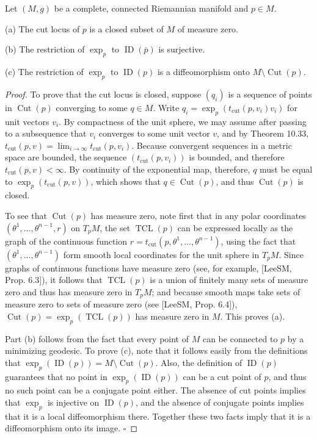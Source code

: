 \begin{theorem}
\label{thm:cut-locus-properties}
Let $(M,g)$ be a complete, connected Riemannian manifold and $p \in M$.

(a) The cut locus of $p$ is a closed subset of $M$ of measure zero.

(b) The restriction of $\exp_p$ to $\operatorname{ID}(\bar{p})$ is surjective.

(c) The restriction of $\exp_p$ to $\operatorname{ID}(p)$ is a diffeomorphism onto $M \setminus \operatorname{Cut}(p)$.

\begin{proof}
To prove that the cut locus is closed, suppose $(q_i)$ is a sequence of points in $\operatorname{Cut}(p)$ converging to some $q \in M$. Write $q_i = \exp_p(t_{\operatorname{cut}}(p, v_i)v_i)$ for unit vectors $v_i$. By compactness of the unit sphere, we may assume after passing to a subsequence that $v_i$ converges to some unit vector $v$, and by Theorem 10.33, $t_{\operatorname{cut}}(p, v) = \lim_{i \to \infty} t_{\operatorname{cut}}(p, v_i)$. Because convergent sequences in a metric space are bounded, the sequence $(t_{\operatorname{cut}}(p, v_i))$ is bounded, and therefore $t_{\operatorname{cut}}(p, v) < \infty$. By continuity of the exponential map, therefore, $q$ must be equal to $\exp_p(t_{\operatorname{cut}}(p, v))$, which shows that $q \in \operatorname{Cut}(p)$, and thus $\operatorname{Cut}(p)$ is closed.

To see that $\operatorname{Cut}(p)$ has measure zero, note first that in any polar coordinates $( \theta ^1, \ldots,  \theta ^{n-1}, r)$ on $T_p M$, the set $\operatorname{TCL}(p)$ can be expressed locally as the graph of the continuous function $r = t_{\operatorname{cut}}(p,  \theta ^1, \ldots,  \theta ^{n-1})$, using the fact that $( \theta ^1, \ldots,  \theta ^{n-1})$ form smooth local coordinates for the unit sphere in $T_p M$. Since graphs of continuous functions have measure zero (see, for example, [LeeSM, Prop. 6.3]), it follows that $\operatorname{TCL}(p)$ is a union of finitely many sets of measure zero and thus has measure zero in $T_p M$; and because smooth maps take sets of measure zero to sets of measure zero (see [LeeSM, Prop. 6.4]), $\operatorname{Cut}(p) = \exp_p(\operatorname{TCL}(p))$ has measure zero in $M$. This proves (a).

Part (b) follows from the fact that every point of $M$ can be connected to $p$ by a minimizing geodesic. To prove (c), note that it follows easily from the definitions that $\exp_p(\operatorname{ID}(p)) = M \setminus \operatorname{Cut}(p)$. Also, the definition of $\operatorname{ID}(p)$ guarantees that no point in $\exp_p(\operatorname{ID}(p))$ can be a cut point of $p$, and thus no such point can be a conjugate point either. The absence of cut points implies that $\exp_p$ is injective on $\operatorname{ID}(p)$, and the absence of conjugate points implies that it is a local diffeomorphism there. Together these two facts imply that it is a diffeomorphism onto its image. $\square$
\end{proof}
\end{theorem}

